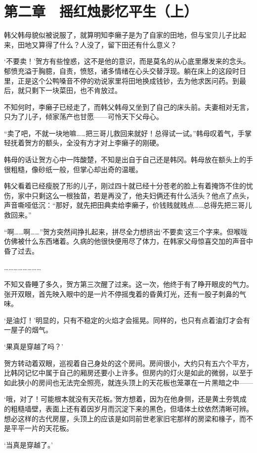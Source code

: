 \section{第二章　摇红烛影忆平生（上）}

韩父韩母貌似被说服了，就算明知李癞子是为了自家的田地，但与宝贝儿子比起来，田地又算得了什么？人没了，留下田还有什么意义？

‘不要卖！’贺方有些惶惑，这不是他的意识，而是莫名的从心底里爆发来的念头。郁愤充溢于胸臆，自责，愤怒，诸多情绪在心头交替浮现。躺在床上的这段时日里，正是这个公鸭嗓音不停的劝说家里将田地换成钱钞，去为他求医问药。到最后，就只剩下一块菜田，也不肯放过。

不知何时，李癞子已经走了，而韩父韩母又坐到了自己的床头前。夫妻相对无言，只为了儿子，倾家荡产也甘愿——可怜天下父母心。

“卖了吧，不就一块地嘛……把三哥儿救回来就好！总得试一试。”韩母叹着气，手掌轻抚着贺方的额头，全没有方才对上李癞子的刚硬。

韩母的话让贺方心中一阵酸楚，不知是出自于自己还是韩冈。韩母放在额头上的手很粗糙，像砂纸一般，但掌心却出奇的温暖。

韩父看着已经瘦脱了形的儿子，刚过四十就已经十分苍老的脸上有着掩饰不住的忧伤，家中只剩这么一根独苗，若是再没了，他夫妇俩还有什么活头？他点了点头，声音嘶哑低沉：“那好，就先把田典卖给李癞子，价钱贱就贱点……总得先把三哥儿救回来。”

“啊……啊……”贺方突然间挣扎起来，拼尽全力想挤出‘不要卖’这三个字来。但喉咙仿佛被什么东西堵着。久病的他很快便用尽了体力，在韩家父母惊喜交加的声音中昏了过去。

……………………

不知又昏睡了多久，贺方第三次醒了过来。这一次，他终于有了睁开眼皮的气力。张开双眼，首先映入眼中的是一片不停摇曳着的昏黄灯光，还有一股子刺鼻的气味。

‘是油灯！’明显的，只有不稳定的火焰才会摇晃。同样的，也只有点着油灯才会有一屋子的烟气。

‘果真是穿越了吗？’

贺方转动着双眼，巡视着自己身处的这个房间。房间很小，大约只有五六个平方，比韩冈记忆中属于自己的厢房还要小上许多。但房内的灯火是如此的微弱，以至于如此狭小的房间也无法完全照亮，就连头顶上的天花板也笼罩在一片黑暗之中——

‘哦，对了！可能根本就没有天花板。’贺方想着，因为在他身侧，还是黄土夯筑成的粗糙墙壁，表面上还有着因岁月而沉淀下来的黑色，但墙体土纹依然清晰可辨。想必这样的古代房屋，头顶上的应该是如同前世老家旧宅那样的房梁和椽子，而不是平平一片的天花板。

‘当真是穿越了。’

